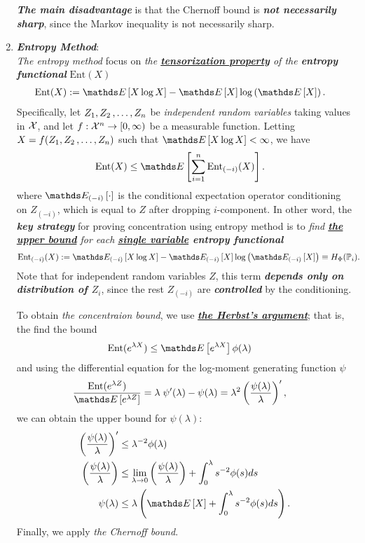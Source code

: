 \documentclass[11pt]{article}
\begin{document}
\begin{enumerate}
\begin{remark}
\emph{\textbf{The main disadvantage}} is that the Chernoff bound is \emph{\textbf{not necessarily sharp}}, since the Markov inequality is not necessarily sharp. 
\end{remark}

\item \emph{\textbf{Entropy Method}}:\\
\emph{The entropy method} focus on \emph{the \underline{\textbf{tensorization property}} of the \textbf{entropy functional}} $\text{Ent}(X)$
\begin{align*}
\text{Ent}(X)&:=  \E{}{X\log X} - \E{}{X}\log\paren{\E{}{X}}.
\end{align*}  Specifically,  let $Z_1, Z_2 \,{,}\ldots{,}\, Z_n$ be \emph{independent random variables} taking values in ${\mathcal X}$, and let $f: {\mathcal X}^n \to [0, \infty)$ be a measurable function. Letting $X = f(Z_1, Z_2 \,{,}\ldots{,}\, Z_n)$ such that $\E{}{X\log X} < \infty$, we have 
\begin{align*}
\text{Ent}(X)  &\le \E{}{\sum_{i=1}^{n} \text{Ent}_{(-i)}(X)}. 
\end{align*} where  $\E{(-i)}{\cdot}$ is the conditional expectation operator conditioning on $Z_{(-i)}$, which is equal to $Z$ after dropping $i$-component. In other word, the \emph{\textbf{key strategy}} for proving concentration using entropy method is to \emph{find \underline{\textbf{the upper bound}} for each \textbf{\underline{single variable} entropy functional}}
\begin{align*}
\text{Ent}_{(-i)}(X)&:=  \E{(-i)}{X\log X} - \E{(-i)}{X}\log\paren{\E{(-i)}{X}} \equiv H_{\Phi}(\bP_i).
\end{align*} Note that for independent random variables $Z$, this term \emph{\textbf{depends only on distribution of $Z_i$}}, since the rest $Z_{(-i)}$ are \emph{\textbf{controlled}} by the conditioning. 

To obtain \emph{the concentraion bound}, we use \underline{\emph{\textbf{the Herbst's argument}}}; that is, the find the bound 
\begin{align*}
\text{Ent}(e^{\lambda X})& \le \E{}{e^{\lambda X}} \phi(\lambda) 
\end{align*} and using the differential equation for the log-moment generating function $\psi$
\begin{align*}
\frac{\text{Ent}(e^{\lambda Z})}{\E{}{e^{\lambda Z}}} &= \lambda\; \psi'(\lambda) - \psi(\lambda) = \lambda^2 \paren{\frac{ \psi(\lambda)}{\lambda}}',
\end{align*} we can obtain the upper bound for $\psi(\lambda)$:
\begin{align*}
 \paren{\frac{ \psi(\lambda)}{\lambda}}' &\le  \lambda^{-2}\phi(\lambda) \\
 \paren{\frac{ \psi(\lambda)}{\lambda}} &\le \lim\limits_{\lambda \to 0}\paren{\frac{ \psi(\lambda)}{\lambda}} + \int_{0}^{\lambda}s^{-2}\phi(s) ds \\
 \psi(\lambda) &\le \lambda\paren{\E{}{X} + \int_{0}^{\lambda}s^{-2}\phi(s) ds}. 
\end{align*} Finally, we apply \emph{the Chernoff bound}.
 

\end{enumerate}
\end{document}
